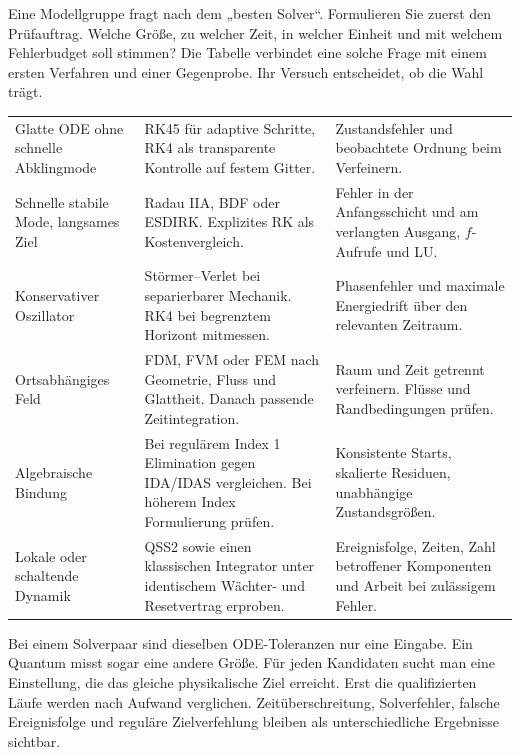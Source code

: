 Eine Modellgruppe fragt nach dem „besten Solver“. Formulieren Sie zuerst den Prüfauftrag. Welche Größe, zu welcher Zeit, in welcher Einheit und mit welchem Fehlerbudget soll stimmen? Die Tabelle verbindet eine solche Frage mit einem ersten Verfahren und einer Gegenprobe. Ihr Versuch entscheidet, ob die Wahl trägt.
{\tblstart\begin{tabularx}{\linewidth}{@{}P{29mm}YY@{}}\toprule
{}&&\\\midrule
Glatte ODE ohne schnelle Abklingmode&RK45 für adaptive Schritte, RK4 als transparente Kontrolle auf festem Gitter.&Zustandsfehler und beobachtete Ordnung beim Verfeinern.\\
Schnelle stabile Mode, langsames Ziel&Radau IIA, BDF oder ESDIRK. Explizites RK als Kostenvergleich.&Fehler in der Anfangsschicht und am verlangten Ausgang, \(f\)-Aufrufe und LU.\\
Konservativer Oszillator&Störmer--Verlet bei separierbarer Mechanik. RK4 bei begrenztem Horizont mitmessen.&Phasenfehler und maximale Energiedrift über den relevanten Zeitraum.\\
Ortsabhängiges Feld&FDM, FVM oder FEM nach Geometrie, Fluss und Glattheit. Danach passende Zeitintegration.&Raum und Zeit getrennt verfeinern. Flüsse und Randbedingungen prüfen.\\
Algebraische Bindung&Bei regulärem Index 1 Elimination gegen IDA/IDAS vergleichen. Bei höherem Index Formulierung prüfen.&Konsistente Starts, skalierte Residuen, unabhängige Zustandsgrößen.\\
Lokale oder schaltende Dynamik&QSS2 sowie einen klassischen Integrator unter identischem Wächter- und Resetvertrag erproben.&Ereignisfolge, Zeiten, Zahl betroffener Komponenten und Arbeit bei zulässigem Fehler.\\\bottomrule
\end{tabularx}\par}
Bei einem Solverpaar sind dieselben ODE-Toleranzen nur eine Eingabe. Ein Quantum misst sogar eine andere Größe. Für jeden Kandidaten sucht man eine Einstellung, die das gleiche physikalische Ziel erreicht. Erst die qualifizierten Läufe werden nach Aufwand verglichen. Zeitüberschreitung, Solverfehler, falsche Ereignisfolge und reguläre Zielverfehlung bleiben als unterschiedliche Ergebnisse sichtbar.

